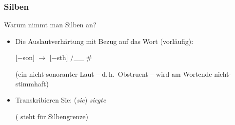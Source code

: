 \begin{frame}
\frametitle{Silben}

Warum nimmt man Silben an?

\begin{itemize}
	\item Die Auslautverhärtung mit Bezug auf das Wort (vorläufig):
	
	\ea {}[$-$son] $\rightarrow$ [$-$sth] /\_\_ \#
             
	{\small (ein nicht-sonoranter Laut -- d.\,h.\ Obstruent -- wird am Wortende nicht-stimmhaft)}
	\z
     
	\item Transkribieren Sie: (\emph{sie}) \emph{siegte}

\pause	

	\ea
	\textipa{[zi:k . t@]} ( steht für Silbengrenze)
	\z

%
%        
\end{itemize}

\end{frame}


